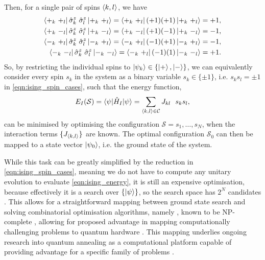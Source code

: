 Then, for a single pair of spins ${ \langle k, l \rangle }$, we have
\begin{equation}
\label{eqn:ising_spin_cases}
\begin{split}
    \bra{+_{k} \ +_{l} } \hat{\sigma}^{z}_{k} \ \hat{\sigma}^z_{l}  \ket{+_{k} \ +_{l} } =  \bra{+_{k} \ +_{l} } (+1)(+1) \ket{+_{k} \ +_{l} } = +1, \\
    \bra{+_{k} \ -_{l} } \hat{\sigma}^{z}_{k} \ \hat{\sigma}^z_{l} \ket{+_{k} \ -_{l} } = \bra{+_{k} \ -_{l} } (+1)(-1) \ket{+_{k} \ -_{l} } = -1 , \\
    \bra{-_{k} \ +_{l} } \hat{\sigma}^{z}_{k} \ \hat{\sigma}^z_{l} \ket{-_{k} \ +_{l} } = \bra{-_{k} \ +_{l} } (-1)(+1) \ket{-_{k} \ +_{l} } = -1, \\
    \bra{-_{k} \ -_{l} } \hat{\sigma}^{z}_{k} \ \hat{\sigma}^z_{l} \ket{-_{k} \ -_{l} } = \bra{-_{k} \ +_{l} } (-1)(1) \ket{-_{k} \ -_{l} } = +1. \\
\end{split}
\end{equation}
So, by restricting the individual spins to $\ket{\psi_k} \in \{\ket{+}, \ket{-}\}$, 
we can equivalently consider every spin $s_k$ in the system
as a binary variable $s_k \in \{\pm 1\}$,
i.e. $s_k s_l = \pm 1$ in \cref{eqn:ising_spin_cases},
such that the energy function,
\begin{equation}
\label{eqn:ising_energy}
E_I(\mathcal{S}) = \braket{ \psi | \hat{H}_I | \psi } = \sum\limits_{{ \langle k, l \rangle } \in { \mathcal{C}}} J_{kl} \ \ s_k s_l,
\end{equation}
can be minimised by optimising the configuration $\mathcal{S} = s_1, \dots, s_N$, when the interaction terms $\{J_{{ \langle k, l \rangle }}\}$ are known.
The optimal configuration $\mathcal{S}_0$ can then be mapped to a 
state vector $\ket{\psi_0}$, i.e. the ground state of the system. 
\par 

While this task can be greatly simplified by the reduction in \cref{eqn:ising_spin_cases}, 
meaning we do not have to compute any unitary evolution to evaluate \cref{eqn:ising_energy},
it is still an expensive optimisation, because effectively it is a search over $\{ \ket{\psi }\}$, 
so the search space has $2^N$ candidates \cite{onsager1944crystal, barahona1982computational}. 
This allows for a straightforward mapping between ground state search 
and solving combinatorial optimisation algorithms, namely , 
known to be NP-complete \cite{garey1979computers}, 
allowing for proposed advantage in mapping computationally challenging problems to quantum hardware \cite{lucas2014ising}. 
This mapping underlies ongoing research into quantum annealing as a computational platform capable of providing 
advantage for a specific family of problems \cite{santoro2006optimization, bapst2013quantum, johnson2011quantum}. 
\par

